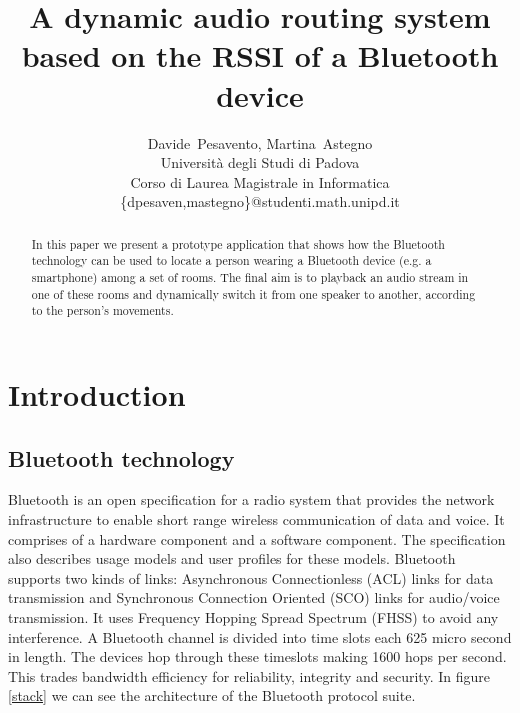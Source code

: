 \documentclass[conference]{IEEEtran}
\title{A dynamic audio routing system\\based on the RSSI of a Bluetooth device}%
\author{Davide~Pesavento, Martina~Astegno \\
	Università degli Studi di Padova \\
	Corso di Laurea Magistrale in Informatica \\
	\{dpesaven,mastegno\}@studenti.math.unipd.it
}
\begin{document}
\maketitle

\begin{abstract}
In this paper we present a prototype application that shows how the Bluetooth technology can be used to locate a person wearing a Bluetooth device (e.g. a smartphone) among a set of rooms. The final aim is to playback an audio stream in one of these rooms and dynamically switch it from one speaker to another, according to the person's movements.
\end{abstract}



\section{Introduction}

\subsection{Bluetooth technology}
Bluetooth is an open specification for a radio system that provides the network infrastructure to enable short range wireless communication of data and voice. It comprises of a hardware component and a software component. The specification also describes usage models and user profiles for these models.
Bluetooth supports two kinds of links: Asynchronous Connectionless (ACL) links for data transmission and Synchronous Connection Oriented (SCO) links for audio/voice transmission. It uses Frequency Hopping Spread Spectrum (FHSS) to avoid any interference. A Bluetooth channel is divided into time slots each 625 micro second in length. The devices hop through these timeslots making 1600 hops per second. This trades bandwidth efficiency for reliability, integrity and security.
In figure \ref{stack} we can see the architecture of the Bluetooth protocol suite.
\end{document}
